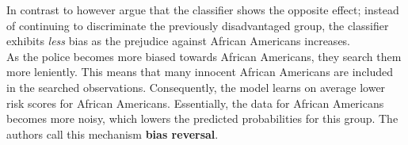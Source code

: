 
In contrast to \cite{kallus2018} however argue that the classifier shows the opposite effect; instead of continuing to discriminate the previously disadvantaged group, the classifier exhibits \textit{less} bias as the prejudice against African Americans increases.\\
As the police becomes more biased towards African Americans, they search them more leniently. This means that many innocent African Americans are included in the searched observations. Consequently, the model learns on average lower risk scores for African Americans. Essentially, the data for African Americans becomes more noisy, which lowers the predicted probabilities for this group. The authors call this mechanism \textbf{bias reversal}.\\

